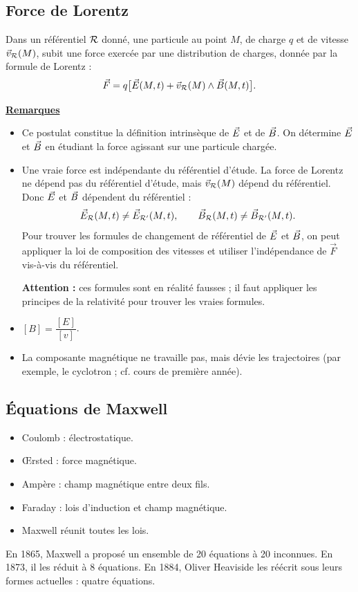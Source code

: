 \documentclass[11pt,a4paper]{article}
\newcommand{\vv}{\vec v}
\newcommand{\titr}[1]{\par\Needspace{4\baselineskip}\textbf{\underline{#1}}\par\nopagebreak[3]}
\newcommand{\stars}[1]{\mathord{\star}\ifnum#1>1\mkern5mu\mathord{\star}\fi\ifnum#1>2\mkern5mu\mathord{\star}\fi\ifnum#1>3\mkern5mu\mathord{\star}\fi\ifnum#1>4\mkern5mu\mathord{\star}\fi\ifnum#1>5\mkern5mu\mathord{\star}\fi}
\newenvironment{result}[1][4]{\begin{cadre}[etoiles={\stars{#1}}]}{\end{cadre}}
\begin{document}
\subsection{Force de Lorentz}
\begin{result}
Dans un référentiel $\mathcal R$ donné, une particule au point $M$, de charge $q$ et de vitesse $\vv_\R(M)$, subit une force exercée par une distribution de charges, donnée par la formule de Lorentz :
\[\vec F=q\bigl[\vE(M,t)+\vv_\R(M)\wedge\vB(M,t)\bigr].\]
\end{result}
\titr{Remarques}
\begin{itemize}
\item Ce postulat constitue la définition intrinsèque de $\vec E$ et de $\vec B$. On détermine $\vec E$ et $\vec B$ en étudiant la force agissant sur une particule chargée.
\item Une vraie force est indépendante du référentiel d'étude. La force de Lorentz ne dépend pas du référentiel d'étude, mais $\vv_\R(M)$ dépend du référentiel. Donc $\vec E$ et $\vec B$ dépendent du référentiel :
\[
\vec E_\mathcal R(M,t)\ne\vec E_{\mathcal R'}(M,t),
\qquad
\vec B_\mathcal R(M,t)\ne\vec B_{\mathcal R'}(M,t).
\]
Pour trouver les formules de changement de référentiel de $\vec E$ et $\vec B$, on peut appliquer la loi de composition des vitesses et utiliser l'indépendance de $\vec F$ vis-à-vis du référentiel.

\textbf{Attention :} ces formules sont en réalité fausses ; il faut appliquer les principes de la relativité pour trouver les vraies formules.
\item $[B]=\dfrac{[E]}{[v]}$.
\item La composante magnétique ne travaille pas, mais dévie les trajectoires (par exemple, le cyclotron ; cf. cours de première année).
\end{itemize}
\subsection{Équations de Maxwell}
\begin{itemize}
\item Coulomb : électrostatique.
\item Œrsted : force magnétique.
\item Ampère : champ magnétique entre deux fils.
\item Faraday : lois d'induction et champ magnétique.
\item Maxwell réunit toutes les lois.
\end{itemize}
En 1865, Maxwell a proposé un ensemble de 20 équations à 20 inconnues. En 1873, il les réduit à 8 équations. En 1884, Oliver Heaviside les réécrit sous leurs formes actuelles : quatre équations.
\end{document}
